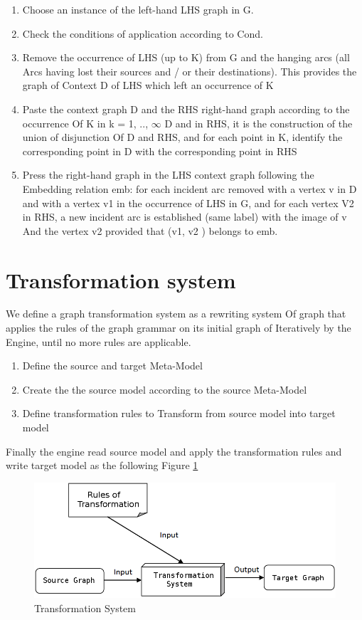 \begin{enumerate}
\item  Choose an instance of the left-hand LHS graph in G.
\item Check the conditions of application according to Cond.
\item Remove the occurrence of LHS (up to K) from G and the hanging arcs (all
Arcs having lost their sources and / or their destinations). This provides the graph of
Context D of LHS which left an occurrence of K
\item
Paste the context graph D and the RHS right-hand graph according to the occurrence
Of K in k = 1, .., $\infty$ D and in RHS, it is the construction of the union of disjunction
Of D and RHS, and for each point in K, identify the corresponding point in
D with the corresponding point in RHS
\item
Press the right-hand graph in the LHS context graph following the
Embedding relation emb: for each incident arc removed with a vertex v in
D and with a vertex v1 in the occurrence of LHS in G, and for each vertex
V2 in RHS, a new incident arc is established (same label) with the image of v
And the vertex v2 provided that (v1, v2 ) belongs to emb. 
\end{enumerate}


 
\section{ Transformation system } 

We define a graph transformation system as a rewriting system
Of graph that applies the rules of the graph grammar on its initial graph of
Iteratively by the Engine, until no more rules are applicable\cite{ch3-doc2,  ch3-doc}.

\begin{enumerate}
\item Define the  source and target Meta-Model 
\item Create the the source model according to the source Meta-Model 
\item Define transformation rules to Transform from source model into target model 
\end{enumerate} 
Finally the engine read source model and apply the transformation rules and write target model as the following Figure \ref{fig:Transformation System}
 
\begin{figure}[th]
	\centering
		\includegraphics[scale=0.4]{ch3/img/systemTran}
	\caption{\label{fig:Transformation System}Transformation System\cite{ch3-img}}
\end{figure} 
 
